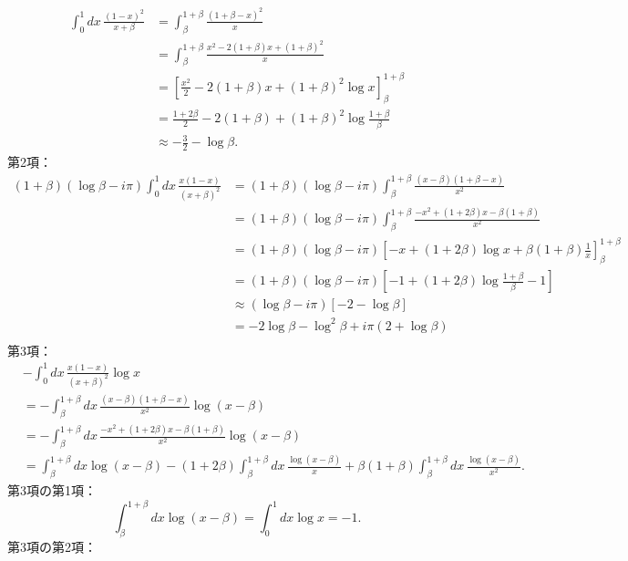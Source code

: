 \begin{align*}
  \int_0^1 dx \, \frac{(1-x)^2}{x+\beta}
  &= \int_\beta^{1+\beta} \frac{(1+\beta-x)^2}{x} \\
  &= \int_\beta^{1+\beta} \frac{x^2 - 2(1+\beta)x + (1+\beta)^2}{x} \\
  &= \left[ \frac{x^2}{2} - 2(1+\beta)x + (1+\beta)^2 \log x \right]_\beta^{1+\beta} \\
  &= \frac{1+2\beta}{2} - 2(1+\beta) + (1+\beta)^2 \log \frac{1+\beta}{\beta} \\
  &\approx - \frac{3}{2} - \log\beta .
\end{align*}
第2項：
\begin{align*}
  (1+\beta)(\log\beta - i\pi) \int_0^1 dx \, \frac{x(1-x)}{(x+\beta)^2}
  &= (1+\beta)(\log\beta - i\pi)\int_\beta^{1+\beta} \frac{(x-\beta)(1+\beta-x)}{x^2} \\
  &= (1+\beta)(\log\beta - i\pi)\int_\beta^{1+\beta} \frac{- x^2 + (1+2\beta)x - \beta(1+\beta)}{x^2} \\
  &= (1+\beta)(\log\beta - i\pi)\left[ - x + (1+2\beta) \log x + \beta(1+\beta) \frac{1}{x} \right]_\beta^{1+\beta} \\
  &= (1+\beta)(\log\beta - i\pi)\left[ - 1 + (1+2\beta) \log \frac{1+\beta}{\beta} - 1 \right] \\
  &\approx (\log\beta - i\pi)\left[ - 2 - \log\beta \right] \\
  &= - 2 \log\beta - \log^2\beta + i\pi (2 + \log\beta) \\
\end{align*}
第3項：
\begin{align*}
  & - \int_0^1 dx \, \frac{x(1-x)}{(x+\beta)^2} \log x \\
  &= - \int_\beta^{1+\beta} dx \, \frac{(x-\beta)(1+\beta-x)}{x^2} \log (x-\beta) \\
  &= - \int_\beta^{1+\beta} dx \, \frac{- x^2 + (1+2\beta)x - \beta(1+\beta)}{x^2} \log (x-\beta) \\
  &=  \int_\beta^{1+\beta} dx \log (x-\beta)
  - (1+2\beta) \int_\beta^{1+\beta} dx \, \frac{\log (x-\beta)}{x}
  + \beta(1+\beta) \int_\beta^{1+\beta} dx \, \frac{\log (x-\beta)}{x^2} .
\end{align*}
第3項の第1項：
\[ \int_\beta^{1+\beta} dx \log (x-\beta) = \int_0^1 dx \log x = -1 . \]
第3項の第2項：
